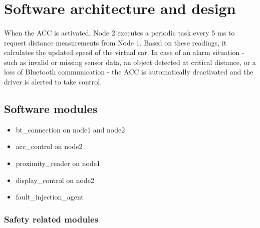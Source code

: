 \section{Software architecture and design}
\label{chapter2}

\paragraph
{}
When the ACC is activated, Node 2 executes a periodic task every 5 ms to request distance measurements from Node 1. Based on these readings, it calculates the updated speed of the virtual car. In case of an alarm situation - such as invalid or missing sensor data, an object detected at critical distance, or a loss of Bluetooth communication - the ACC is automatically deactivated and the driver is alerted to take control.

\subsection{Software modules}

\begin{itemize}
	\item bt\_connection on node1 and node2
	\item acc\_control on node2
	\item proximity\_reader on node1
	\item display\_control on node2
	\item fault\_injection\_agent
\end{itemize}


\subsubsection{Safety related modules}


